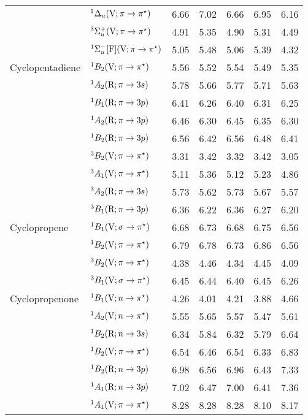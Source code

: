 \begin{tabular}{p{3.5cm}p{3.3cm}c|cccc}
        & $^1\Delta_u (\mathrm{V}; \pi \rightarrow \pi^\star)$ 			& 6.66 	&7.02	&6.66	&6.95	&6.16\\
        & $^3\Sigma_u^+ (\mathrm{V}; \pi \rightarrow \pi^\star)$ 			& 4.91	&5.35	&4.90	&5.31	&4.49\\
        & $^1\Sigma_u^-  [\mathrm{F}]  (\mathrm{V}; \pi \rightarrow \pi^\star)$		& 5.05 	&5.48	&5.06	&5.39	&4.32\\
  Cyclopentadiene&$^1B_2 (\mathrm{V}; \pi \rightarrow \pi^\star)$	 			& 5.56	&5.52	&5.54	&5.49	&5.35\\
        &$^1A_2 (\mathrm{R}; \pi \rightarrow 3s)$			 	& 5.78	&5.66	&5.77	&5.71	&5.63\\
        &$^1B_1  (\mathrm{R}; \pi \rightarrow 3p)$			 	& 6.41	&6.26	&6.40	&6.31	&6.25\\
        &$^1A_2  (\mathrm{R}; \pi \rightarrow 3p)$			 	& 6.46	&6.30	&6.45	&6.35	&6.30\\
        &$^1B_2  (\mathrm{R}; \pi \rightarrow 3p)$			 	& 6.56	&6.42	&6.56	&6.48	&6.41\\
        &$^3B_2 (\mathrm{V}; \pi \rightarrow \pi^\star)$		 		& 3.31	&3.42	&3.32	&3.42	&3.05\\
        &$^3A_1 (\mathrm{V}; \pi \rightarrow \pi^\star)$		 		& 5.11	&5.36	&5.12	&5.23	&4.86\\
        &$^3A_2 (\mathrm{R}; \pi \rightarrow 3s)$			 	& 5.73	&5.62	&5.73	&5.67	&5.57\\
        &$^3B_1 (\mathrm{R}; \pi \rightarrow 3p)$			 	& 6.36	&6.22	&6.36	&6.27	&6.20\\ 	
  Cyclopropene	&$^1B_1 (\mathrm{V};\sigma \rightarrow \pi^\star)$				&6.68	&6.73	&6.68	&6.75	&6.56	\\
        &$^1B_2 (\mathrm{V};\pi \rightarrow \pi^\star)$				&6.79	&6.78	&6.73	&6.86	&6.56	\\
        &$^3B_2 (\mathrm{V};\pi \rightarrow \pi^\star)$				&4.38	&4.46	&4.34	&4.45	&4.09 	\\
        &$^3B_1 (\mathrm{V};\sigma \rightarrow \pi^\star)$				&6.45	&6.44	&6.40	&6.45	&6.26 	\\
  Cyclopropenone&$^1B_1 (\mathrm{V}; n \rightarrow \pi^\star)$				& 4.26 	&4.01	&4.21	&3.88	&4.66\\ 	
        &$^1A_2 (\mathrm{V}; n \rightarrow \pi^\star)$					& 5.55	&5.65	&5.57	&5.47	&5.61\\ 	
        &$^1B_2 (\mathrm{R}; n \rightarrow 3s)$					& 6.34	&5.84	&6.32	&5.79	&6.64\\ 	
        &$^1B_2 (\mathrm{V}; \pi \rightarrow \pi^\star)$				& 6.54	&6.46	&6.54	&6.33	&6.83\\ 	
        &$^1B_2 (\mathrm{R}; n \rightarrow 3p)$					& 6.98	&6.56	&6.96	&6.43	&7.33\\ 	
        &$^1A_1 (\mathrm{R}; n \rightarrow 3p)$					& 7.02	&6.47	&7.00	&6.41	&7.36\\ 	
        &$^1A_1 (\mathrm{V}; \pi \rightarrow \pi^\star)$				& 8.28	&8.28	&8.28	&8.10	&8.17\\ 	

\end{tabular}
